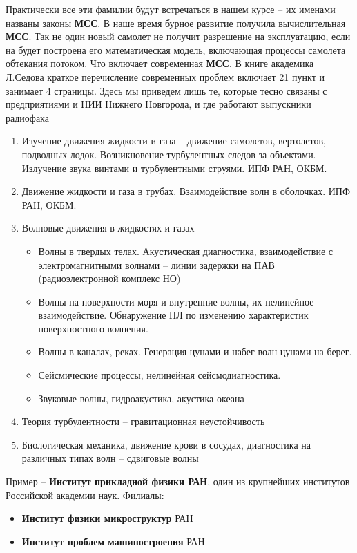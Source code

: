 Практически все эти фамилии будут встречаться в нашем курсе – их именами названы законы \textbf{МСС}.
В наше время бурное развитие получила вычислительная \textbf{МСС}. Так не один новый самолет не получит разрешение на эксплуатацию, если на будет построена его математическая модель, включающая процессы самолета  обтекания потоком.
Что включает современная \textbf{МСС}. В книге академика Л.Седова краткое перечисление современных проблем включает 21 пункт и занимает 4 страницы. Здесь мы приведем лишь те, которые тесно связаны с предприятиями и НИИ Нижнего Новгорода, и где работают выпускники радиофака

\begin{enumerate}
	\item Изучение движения жидкости и газа – движение самолетов, вертолетов, подводных лодок.  Возникновение турбулентных следов за объектами. Излучение звука винтами и турбулентными струями. ИПФ РАН, ОКБМ.
	\item Движение жидкости и газа в трубах. Взаимодействие волн в оболочках. ИПФ РАН, ОКБМ.
	\item Волновые движения в жидкостях и газах
	\begin{itemize}
		\item Волны в твердых телах.  Акустическая диагностика, взаимодействие с электромагнитными волнами – линии задержки на ПАВ (радиоэлектронной комплекс НО)
		\item Волны на поверхности моря и внутренние волны, их нелинейное взаимодействие. Обнаружение ПЛ по изменению характеристик поверхностного волнения.
		\item Волны в каналах, реках. Генерация цунами и  набег волн цунами на берег.
		\item Сейсмические процессы, нелинейная сейсмодиагностика.
		\item Звуковые волны,  гидроакустика, акустика океана
	\end{itemize}
	\item Теория турбулентности – гравитационная неустойчивость
	\item Биологическая механика, движение крови в сосудах, диагностика на различных типах волн – сдвиговые волны
\end{enumerate}
Пример – \textbf{Институт прикладной физики РАН}, один из крупнейших институтов Российской академии наук.
Филиалы:
\begin{itemize}
	\item \textbf{Институт физики микроструктур} РАН
	\item \textbf{Институт проблем машиностроения} РАН
\end{itemize}

